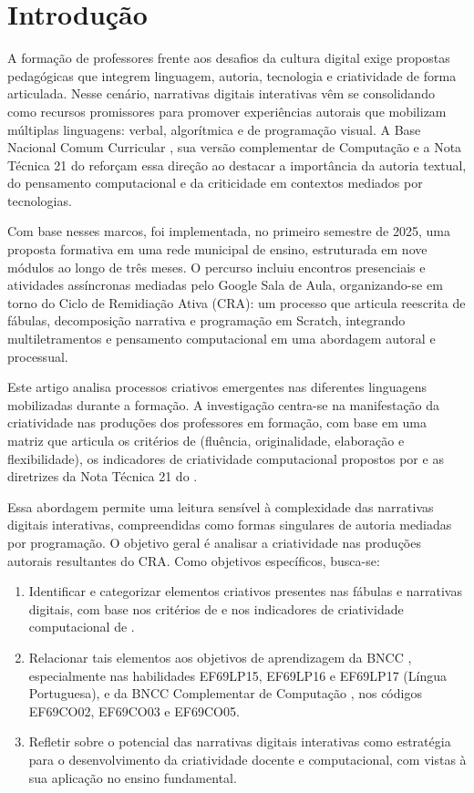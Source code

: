 \documentclass[portuguese]{textolivre}
\begin{document}
\section{Introdução}\label{sec-intro}

A formação de professores frente aos desafios da cultura digital exige propostas pedagógicas que integrem linguagem, autoria, tecnologia e criatividade de forma articulada. Nesse cenário, narrativas digitais interativas vêm se consolidando como recursos promissores para promover experiências autorais que mobilizam múltiplas linguagens: verbal, algorítmica e de programação visual. A Base Nacional Comum Curricular \cite{bncc2018}, sua versão complementar de Computação \cite{cne2022} e a Nota Técnica 21 do \textcite{cieb2024} reforçam essa direção ao destacar a importância da autoria textual, do pensamento computacional e da criticidade em contextos mediados por tecnologias.

Com base nesses marcos, foi implementada, no primeiro semestre de 2025, uma proposta formativa em uma rede municipal de ensino, estruturada em nove módulos ao longo de três meses. O percurso incluiu encontros presenciais e atividades assíncronas mediadas pelo Google Sala de Aula, organizando-se em torno do Ciclo de Remidiação Ativa (CRA): um processo que articula reescrita de fábulas, decomposição narrativa e programação em Scratch, integrando multiletramentos e pensamento computacional em uma abordagem autoral e processual.

Este artigo analisa processos criativos emergentes nas diferentes linguagens mobilizadas durante a formação. A investigação centra-se na manifestação da criatividade nas produções dos professores em formação, com base em uma matriz que articula os critérios de \textcite{torrance1995} (fluência, originalidade, elaboração e flexibilidade), os indicadores de criatividade computacional propostos por \textcite{brennan2012} e as diretrizes da Nota Técnica 21 do \textcite{cieb2024}.

Essa abordagem permite uma leitura sensível à complexidade das narrativas digitais interativas, compreendidas como formas singulares de autoria mediadas por programação. O objetivo geral é analisar a criatividade nas produções autorais resultantes do CRA. Como objetivos específicos, busca-se:

\begin{enumerate}[label=\alph*)]
\item Identificar e categorizar elementos criativos presentes nas fábulas e narrativas digitais, com base nos critérios de \textcite{torrance1995} e nos indicadores de criatividade computacional de \textcite{brennan2012}.
\item Relacionar tais elementos aos objetivos de aprendizagem da BNCC \cite{bncc2018}, especialmente nas habilidades EF69LP15, EF69LP16 e EF69LP17 (Língua Portuguesa), e da BNCC Complementar de Computação \cite{cne2022}, nos códigos EF69CO02, EF69CO03 e EF69CO05.
\item Refletir sobre o potencial das narrativas digitais interativas como estratégia para o desenvolvimento da criatividade docente e computacional, com vistas à sua aplicação no ensino fundamental.
\end{enumerate}
\end{document}

